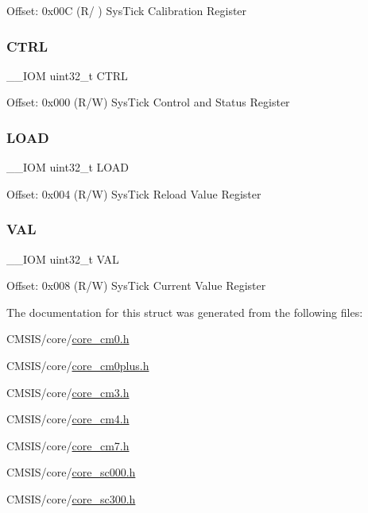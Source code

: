 Offset\+: 0x00C (R/ ) Sys\+Tick Calibration Register \mbox{\label{struct_sys_tick___type_ac81efc171e9852a36caeb47122bfec5b}} 
\subsubsection{\texorpdfstring{C\+T\+RL}{CTRL}}
{\footnotesize\ttfamily \+\_\+\+\_\+\+I\+OM uint32\+\_\+t C\+T\+RL}

Offset\+: 0x000 (R/W) Sys\+Tick Control and Status Register \mbox{\label{struct_sys_tick___type_a0c1333686137b7e25a46bd548a5b5bc3}} 
\subsubsection{\texorpdfstring{L\+O\+AD}{LOAD}}
{\footnotesize\ttfamily \+\_\+\+\_\+\+I\+OM uint32\+\_\+t L\+O\+AD}

Offset\+: 0x004 (R/W) Sys\+Tick Reload Value Register \mbox{\label{struct_sys_tick___type_ae7a655a853654127f3dfb7fa32c3f457}} 
\subsubsection{\texorpdfstring{V\+AL}{VAL}}
{\footnotesize\ttfamily \+\_\+\+\_\+\+I\+OM uint32\+\_\+t V\+AL}

Offset\+: 0x008 (R/W) Sys\+Tick Current Value Register 

The documentation for this struct was generated from the following files\+:\begin{DoxyCompactItemize}
\item 
C\+M\+S\+I\+S/core/\hyperlink{core__cm0_8h}{core\+\_\+cm0.\+h}\item 
C\+M\+S\+I\+S/core/\hyperlink{core__cm0plus_8h}{core\+\_\+cm0plus.\+h}\item 
C\+M\+S\+I\+S/core/\hyperlink{core__cm3_8h}{core\+\_\+cm3.\+h}\item 
C\+M\+S\+I\+S/core/\hyperlink{core__cm4_8h}{core\+\_\+cm4.\+h}\item 
C\+M\+S\+I\+S/core/\hyperlink{core__cm7_8h}{core\+\_\+cm7.\+h}\item 
C\+M\+S\+I\+S/core/\hyperlink{core__sc000_8h}{core\+\_\+sc000.\+h}\item 
C\+M\+S\+I\+S/core/\hyperlink{core__sc300_8h}{core\+\_\+sc300.\+h}\end{DoxyCompactItemize}
